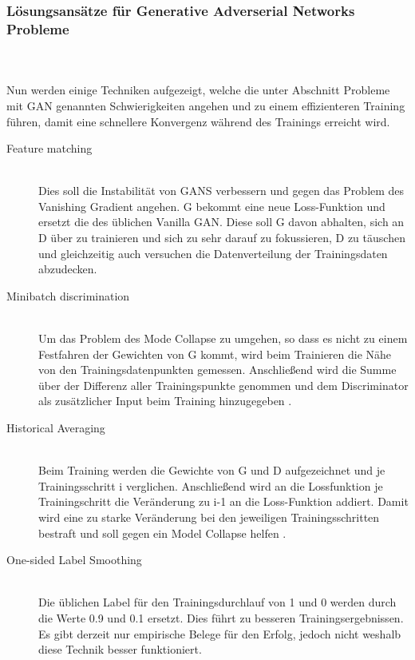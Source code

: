 \documentclass{llncs}
\begin{document}
\subsubsection{Lösungsansätze für Generative Adverserial Networks Probleme}
~\\\\
Nun werden einige Techniken aufgezeigt, welche die unter Abschnitt Probleme mit GAN genannten Schwierigkeiten angehen und zu einem effizienteren Training führen, damit eine schnellere Konvergenz während des Trainings erreicht wird.
\\
\begin{description}
\item[Feature matching]
~\\
Dies soll die Instabilität von GANS verbessern und gegen das Problem des Vanishing Gradient angehen. G bekommt eine neue Loss-Funktion und ersetzt die des üblichen Vanilla GAN. Diese soll G davon abhalten, sich an D über zu trainieren und sich zu sehr darauf zu fokussieren, D zu täuschen und gleichzeitig auch versuchen die Datenverteilung der Trainingsdaten abzudecken\cite{improvingan}.\\

\item[Minibatch discrimination] 
~\\
Um das Problem des Mode Collapse zu umgehen, so dass es nicht zu einem Festfahren der Gewichten von G kommt, wird beim Trainieren die Nähe von den Trainingsdatenpunkten gemessen. Anschließend wird die Summe über der Differenz aller Trainingspunkte genommen und dem Discriminator als zusätzlicher Input beim Training hinzugegeben \cite{improvingan}.\\

\item[Historical Averaging]
~\\
Beim Training werden die Gewichte von G und D aufgezeichnet und je Trainingsschritt i verglichen. Anschließend wird an die Lossfunktion je Trainingschritt die Veränderung zu i-1 an die Loss-Funktion addiert. Damit wird eine zu starke Veränderung bei den jeweiligen Trainingsschritten bestraft und soll gegen ein Model Collapse helfen \cite{improvingan}.\\

\item[One-sided Label Smoothing]
~\\
Die üblichen Label für den Trainingsdurchlauf von 1 und 0 werden durch die Werte 0.9 und 0.1 ersetzt. Dies führt zu besseren Trainingsergebnissen. Es gibt derzeit nur empirische Belege für den Erfolg, jedoch nicht weshalb diese Technik besser funktioniert\cite{improvingan}.\\


\end{description}
\end{document}
